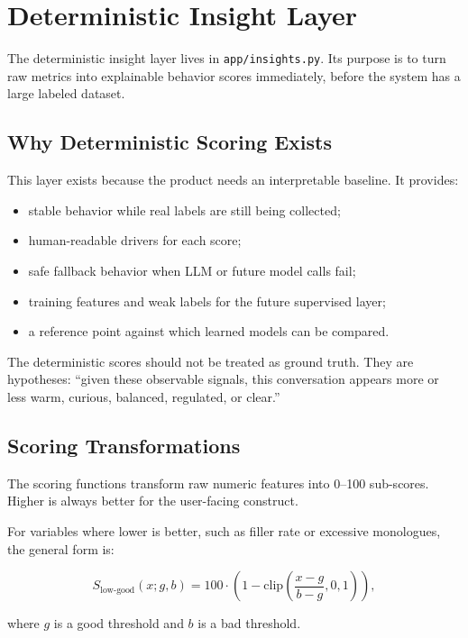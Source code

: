 \documentclass[11pt]{article}
\begin{document}
\section{Deterministic Insight Layer}

The deterministic insight layer lives in \texttt{app/insights.py}. Its purpose is to turn raw metrics into explainable behavior scores immediately, before the system has a large labeled dataset.

\subsection{Why Deterministic Scoring Exists}

This layer exists because the product needs an interpretable baseline. It provides:

\begin{itemize}[leftmargin=*]
  \item stable behavior while real labels are still being collected;
  \item human-readable drivers for each score;
  \item safe fallback behavior when LLM or future model calls fail;
  \item training features and weak labels for the future supervised layer;
  \item a reference point against which learned models can be compared.
\end{itemize}

The deterministic scores should not be treated as ground truth. They are hypotheses: ``given these observable signals, this conversation appears more or less warm, curious, balanced, regulated, or clear.''

\subsection{Scoring Transformations}

The scoring functions transform raw numeric features into 0--100 sub-scores. Higher is always better for the user-facing construct.

For variables where lower is better, such as filler rate or excessive monologues, the general form is:

\[
S_{\text{low-good}}(x; g, b)
= 100 \cdot \left(1 - \mathrm{clip}\left(\frac{x-g}{b-g}, 0, 1\right)\right),
\]

where \(g\) is a good threshold and \(b\) is a bad threshold.
\end{document}
